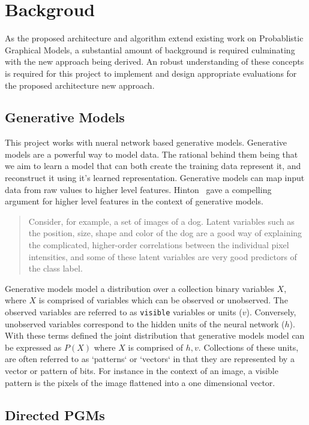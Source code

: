 \chapter{Backgroud}

As the proposed architecture and algorithm extend existing work on Probablistic Graphical Models, a substantial amount of background is required culminating with the new approach being derived. An robust understanding of these concepts is required for this project to implement and design appropriate evaluations for the proposed architecture new approach.

\section{Generative Models}\label{S:Generative-Models}

This project works with nueral network based generative models.
Generative models are a powerful way to model data. The rational behind them being that we aim to learn a model that can both create the training data represent it, and reconstruct it using it's learned representation. Generative models can map input data from raw values to higher level features. Hinton~\cite{hinton:32723:vv} gave a compelling argument for higher level features in the context of generative models. \begin{quote} Consider, for example, a set of images of a dog. Latent variables such as the position, size, shape and color of the dog are a good way of explaining the complicated, higher-order correlations between the individual pixel intensities, and some of these latent variables are very good predictors of the class label.\end{quote}

Generative models model a distribution over a collection binary variables $X$, where $X$ is comprised of variables which can be observed or unobserved. The observed variables are referred to as \texttt{visible} variables or units ($v$). Conversely, unobserved variables correspond to the hidden units of the neural network ($h$). With these terms defined the joint distribution that generative models model can be expressed as $P(X)$ where $X$ is comprised of $h,v$. Collections of these units, are often referred to as `patterns` or `vectors` in that they are represented by a vector or pattern of bits. For instance in the context of an image, a visible pattern is the pixels of the image flattened into a one dimensional vector.

\section{Directed PGMs}


